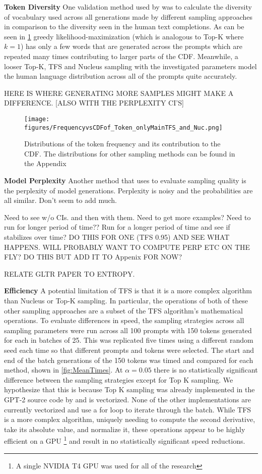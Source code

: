 \documentclass{article}
\begin{document}
\textbf{Token Diversity} 
One validation method used by \cite{Nucleus} was to calculate the diversity of vocabulary used across all generations made by different sampling approaches in comparison to the diversity seen in the human text completions. As can be seen in \ref{fig:TokenDistributions} greedy likelihood-maximization (which is analogous to Top-K where $k=1$) has only a few words that are generated across the prompts which are repeated many times contributing to larger parts of the CDF. Meanwhile, a looser Top-K, TFS and Nucleus sampling with the investigated parameters model the human language distribution across all of the prompts quite accurately.

HERE IS WHERE GENERATING MORE SAMPLES MIGHT MAKE A DIFFERENCE. [ALSO WITH THE PERPLEXITY CI'S]

\begin{figure}[h]
    \texttt{[image: figures/FrequencyvsCDFof\_Token\_onlyMainTFS\_and\_Nuc.png]}
    \caption{Distributions of the token frequency and its contribution to the CDF. The distributions for other sampling methods can be found in the Appendix}
    \label{fig:TokenDistributions}
\end{figure}

\textbf{Model Perplexity} 
Another method that \cite{Grover} uses to evaluate sampling quality is the perplexity of model generations. Perplexity is noisy and the probabilities are all similar. Don't seem to add much. 

Need to see w/o CIs. and then with them. Need to get more examples? Need to run for longer period of time?? Run for a longer period of time and see if stabilizes over time? DO THIS FOR ONE (TFS 0.95) AND SEE WHAT HAPPENS. WILL PROBABLY WANT TO COMPUTE PERP ETC ON THE FLY? DO THIS BUT ADD IT TO Appenix FOR NOW? 

RELATE GLTR PAPER TO ENTROPY. 

\textbf{Efficiency} A potential limitation of TFS is that it is a more complex algorithm than Nucleus or Top-K sampling. In particular, the operations of both of these other sampling approaches are a subset of the TFS algorithm's mathematical operations. To evaluate differences in speed, the sampling strategies across all sampling parameters were run across all 100 prompts with 150 tokens generated for each in batches of 25. This was replicated five times using a different random seed each time so that different prompts and tokens were selected. The start and end of the batch generations of the 150 tokens was timed and compared for each method, shown in \ref{fig:MeanTimes}. At $\alpha=0.05$ there is no statistically significant difference between the sampling strategies except for Top K sampling. We hypothesize that this is because Top K sampling was already implemented in the GPT-2 source code by \cite{radford2019language} and is vectorized. None of the other implementations are currently vectorized and use a for loop to iterate through the batch. While TFS is a more complex algorithm, uniquely needing to compute the second derivative, take its absolute value, and normalize it, these operations appear to be highly efficient on a GPU \footnote{A single NVIDIA T4 GPU was used for all of the research} and result in no statistically significant speed reductions. 
\end{document}
